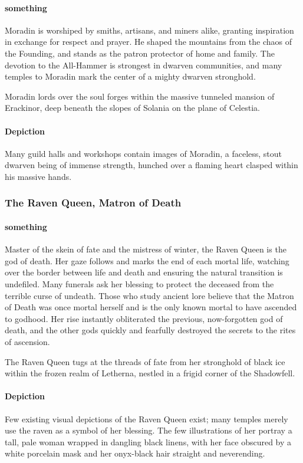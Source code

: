 \documentclass[letterpaper,twocolumn,openany,nodeprecatedcode]{dndbook}
\begin{document}
\paragraph{something}
Moradin is worshiped by smiths, artisans, and miners alike, granting inspiration in
exchange for respect and prayer. He shaped the mountains from the chaos of the Founding,
and stands as the patron protector of home and family. The devotion to the All-Hammer is
strongest in dwarven communities, and many temples to Moradin mark the center of a mighty
dwarven stronghold.

Moradin lords over the soul forges within the massive tunneled mansion of Erackinor,
deep beneath the slopes of Solania on the plane of Celestia.

\paragraph{Depiction}
Many guild halls and workshops contain images of Moradin, a faceless, stout dwarven
being of immense strength, hunched over a flaming heart clasped within his massive hands.

\subsubsection{The Raven Queen, Matron of Death}

\paragraph{something}
Master of the skein of fate and the mistress of winter, the Raven Queen is the god of
death. Her gaze follows and marks the end of each mortal life, watching over the border
between life and death and ensuring the natural transition is undefiled. Many funerals
ask her blessing to protect the deceased from the terrible curse of undeath. Those who
study ancient lore believe that the Matron of Death was once mortal herself and is the
only known mortal to have ascended to godhood. Her rise instantly obliterated the previous,
now-forgotten god of death, and the other gods quickly and fearfully destroyed the secrets
to the rites of ascension.

The Raven Queen tugs at the threads of fate from her stronghold of black ice within the
frozen realm of Letherna, nestled in a frigid corner of the Shadowfell.

\paragraph{Depiction}
Few existing visual depictions of the Raven Queen exist; many temples merely use the
raven as a symbol of her blessing. The few illustrations of her portray a tall, pale
woman wrapped in dangling black linens, with her face obscured by a white porcelain
mask and her onyx-black hair straight and neverending.
\end{document}
